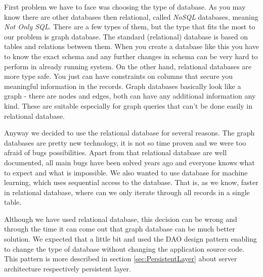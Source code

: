 First problem we have to face was choosing the type of database. As you may know there are other databases then relational, called \emph{NoSQL} databases, meaning \emph{Not Only SQL}. There are a few types of them, but the type that fits the most to our problem is graph database. The standard (relational) database is based on tables and relations between them. When you create a database like this you have to know the exact schema and any further changes in schema can be very hard to perform in already running system. On the other hand, relational databases are more type safe. You just can have constraints on columns that secure you meaningful information in the records. Graph databases basically look like a graph - there are nodes and edges, both can have any additional information any kind. These are suitable especially for graph queries that can't be done easily in relational database.

Anyway we decided to use the relational database for several reasons.
The graph databases are pretty new technology, it is not so time proven and we were too afraid of bugs possibilities. Apart from that relational database are well documented, all main bugs have been solved years ago and everyone knows what to expect and what is impossible.
We also wanted to use database for machine learning, which uses sequential access to the database. That is, as we know, faster in relational database, where can we only iterate through all records in a single table.

Although we have used relational database, this decision can be wrong and through the time it can come out that graph database can be much better solution. We expected that a little bit and used the DAO design pattern enabling to change the type of database without changing the application source code. This pattern is more described in section \ref{sec:PersistentLayer} about server architecture respectively persistent layer.

